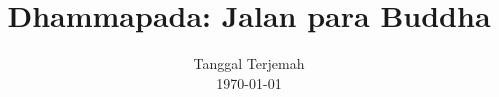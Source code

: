 \documentclass[a4paper, openany]{book}
\begin{document}
\pagestyle{empty}
\title{Dhammapada: Jalan para Buddha}
\date{Tanggal Terjemah\\
      \today}
\maketitle


\pagestyle{mystyle}
\setcounter{page}{1}
\end{document}
